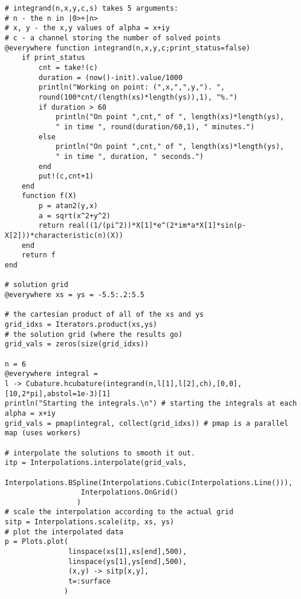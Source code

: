 \begin{homeworkProblem}
\begin{verbatim}
# integrand(n,x,y,c,s) takes 5 arguments:
# n - the n in |0>+|n>
# x, y - the x,y values of alpha = x+iy
# c - a channel storing the number of solved points
@everywhere function integrand(n,x,y,c;print_status=false)
    if print_status
        cnt = take!(c)
        duration = (now()-init).value/1000
        println("Working on point: (",x,",",y,"). ",
        round(100*cnt/(length(xs)*length(ys)),1), "%.")
        if duration > 60
            println("On point ",cnt," of ", length(xs)*length(ys),
            " in time ", round(duration/60,1), " minutes.")
        else
            println("On point ",cnt," of ", length(xs)*length(ys),
            " in time ", duration, " seconds.")
        end
        put!(c,cnt+1)
    end
    function f(X)
        p = atan2(y,x)
        a = sqrt(x^2+y^2)
        return real((1/(pi^2))*X[1]*e^(2*im*a*X[1]*sin(p-X[2]))*characteristic(n)(X))
    end
    return f
end

# solution grid
@everywhere xs = ys = -5.5:.2:5.5

# the cartesian product of all of the xs and ys
grid_idxs = Iterators.product(xs,ys)
# the solution grid (where the results go)
grid_vals = zeros(size(grid_idxs))

n = 6
@everywhere integral =
l -> Cubature.hcubature(integrand(n,l[1],l[2],ch),[0,0],[10,2*pi],abstol=1e-3)[1]
println("Starting the integrals.\n") # starting the integrals at each alpha = x+iy
grid_vals = pmap(integral, collect(grid_idxs)) # pmap is a parallel map (uses workers)

# interpolate the solutions to smooth it out.
itp = Interpolations.interpolate(grid_vals,
                  Interpolations.BSpline(Interpolations.Cubic(Interpolations.Line())),
                  Interpolations.OnGrid()
                 )
# scale the interpolation according to the actual grid
sitp = Interpolations.scale(itp, xs, ys)
# plot the interpolated data
p = Plots.plot(
               linspace(xs[1],xs[end],500),
               linspace(ys[1],ys[end],500),
               (x,y) -> sitp[x,y],
               t=:surface
              )
    \end{verbatim}
\end{homeworkProblem}
